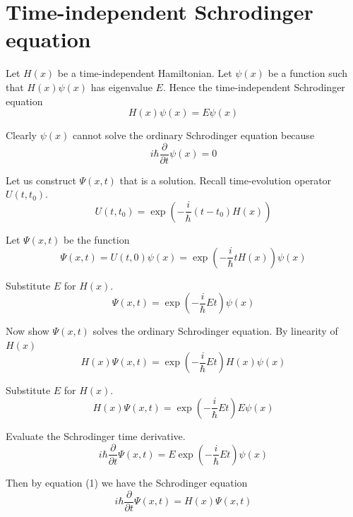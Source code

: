 

\section*{Time-independent Schrodinger equation}

Let $H(x)$ be a time-independent Hamiltonian.
Let $\psi(x)$ be a function such that $H(x)\psi(x)$ has eigenvalue $E$.
Hence the time-independent Schrodinger equation
\begin{equation*}
H(x)\psi(x)=E\psi(x)
\end{equation*}

Clearly $\psi(x)$ cannot solve the ordinary Schrodinger equation because
\begin{equation*}
i\hbar\frac{\partial}{\partial t}\psi(x)=0
\end{equation*}

Let us construct $\Psi(x,t)$ that is a solution.
Recall time-evolution operator $U(t,t_0)$.
\begin{equation*}
U(t,t_0)=\exp\left(-\frac{i}{\hbar}(t-t_0)H(x)\right)
\end{equation*}

Let $\Psi(x,t)$ be the function
\begin{equation*}
\Psi(x,t)=U(t,0)\psi(x)=\exp\left(-\frac{i}{\hbar}tH(x)\right)\psi(x)
\end{equation*}

Substitute $E$ for $H(x)$.
\begin{equation*}
\Psi(x,t)=\exp\left(-\frac{i}{\hbar}Et\right)\psi(x)
\end{equation*}

Now show $\Psi(x,t)$ solves the ordinary Schrodinger equation.
By linearity of $H(x)$
\begin{equation*}
H(x)\Psi(x,t)=\exp\left(-\frac{i}{\hbar}Et\right)H(x)\psi(x)
\end{equation*}

Substitute $E$ for $H(x)$.
\begin{equation*}
H(x)\Psi(x,t)=\exp\left(-\frac{i}{\hbar}Et\right)E\psi(x)
\tag{1}
\end{equation*}

Evaluate the Schrodinger time derivative.
\begin{equation*}
i\hbar\frac{\partial}{\partial t}\Psi(x,t)
=E\exp\left(-\frac{i}{\hbar}Et\right)\psi(x)
\end{equation*}

Then by equation (1) we have the Schrodinger equation
\begin{equation*}
i\hbar\frac{\partial}{\partial t}\Psi(x,t)=H(x)\Psi(x,t)
\end{equation*}

